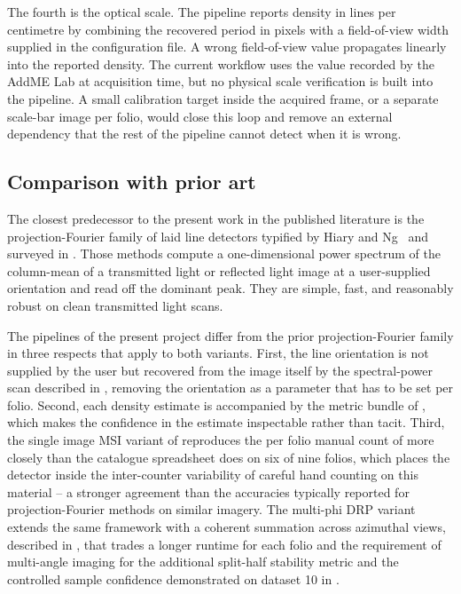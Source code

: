 The fourth is the optical scale. The pipeline reports density in
lines per centimetre by combining the recovered period in pixels
with a field-of-view width supplied in the configuration
file. A wrong field-of-view value propagates linearly into the
reported density. The current workflow uses the value recorded by
the AddME Lab at acquisition time, but no physical scale
verification is built into the pipeline. A small calibration
target inside the acquired frame, or a separate scale-bar image
per folio, would close this loop and remove an external dependency
that the rest of the pipeline cannot detect when it is wrong.

\subsection{Comparison with prior art}
\label{sec:discussion:prior_art}

The closest predecessor to the present work in the published
literature is the projection-Fourier family of laid line detectors
typified by Hiary and Ng~\cite{hiary2007paper} and surveyed in
. Those methods compute a
one-dimensional power spectrum of the column-mean of a
transmitted light or reflected light image at a user-supplied
orientation and read off the dominant peak. They are simple, fast,
and reasonably robust on clean transmitted light scans.

The pipelines of the present project differ from the prior
projection-Fourier family in three respects that apply to both
variants. First, the line orientation is not supplied by the user
but recovered from the image itself by the spectral-power scan
described in , removing the
orientation as a parameter that has to be set per folio. Second,
each density estimate is accompanied by the metric bundle of
, which makes the confidence in the
estimate inspectable rather than tacit. Third, the
single image MSI variant of  reproduces
the per folio manual count of  more
closely than the catalogue spreadsheet does on six of nine folios,
which places the detector inside the inter-counter variability
of careful hand counting on this material -- a stronger
agreement than the accuracies typically reported for
projection-Fourier methods on similar imagery. The multi-phi DRP variant
extends the same framework with a coherent summation across
azimuthal views, described in , that
trades a longer runtime for each folio and the requirement of
multi-angle imaging for the additional split-half stability metric
and the controlled sample confidence demonstrated on dataset 10 in
.

